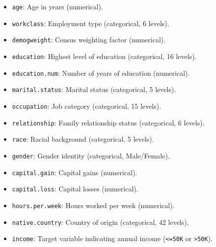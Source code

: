 \documentclass[
  11pt,
]{book}
\newcommand{\passthrough}[1]{#1}
\providecommand{\tightlist}{%
  \setlength{\itemsep}{0pt}\setlength{\parskip}{0pt}}
\theoremstyle{definition}
\theoremstyle{definition}
\theoremstyle{definition}
\theoremstyle{definition}
\theoremstyle{remark}
\begin{document}
\begin{itemize}
\tightlist
\item
  \passthrough{\lstinline!age!}: Age in years (numerical).\\
\item
  \passthrough{\lstinline!workclass!}: Employment type (categorical, 6 levels).\\
\item
  \passthrough{\lstinline!demogweight!}: Census weighting factor (numerical).\\
\item
  \passthrough{\lstinline!education!}: Highest level of education (categorical, 16 levels).\\
\item
  \passthrough{\lstinline!education.num!}: Number of years of education (numerical).\\
\item
  \passthrough{\lstinline!marital.status!}: Marital status (categorical, 5 levels).\\
\item
  \passthrough{\lstinline!occupation!}: Job category (categorical, 15 levels).\\
\item
  \passthrough{\lstinline!relationship!}: Family relationship status (categorical, 6 levels).\\
\item
  \passthrough{\lstinline!race!}: Racial background (categorical, 5 levels).\\
\item
  \passthrough{\lstinline!gender!}: Gender identity (categorical, Male/Female).\\
\item
  \passthrough{\lstinline!capital.gain!}: Capital gains (numerical).\\
\item
  \passthrough{\lstinline!capital.loss!}: Capital losses (numerical).\\
\item
  \passthrough{\lstinline!hours.per.week!}: Hours worked per week (numerical).\\
\item
  \passthrough{\lstinline!native.country!}: Country of origin (categorical, 42 levels).\\
\item
  \passthrough{\lstinline!income!}: Target variable indicating annual income (\passthrough{\lstinline!<=50K!} or \passthrough{\lstinline!>50K!}).
\end{itemize}
\end{document}
